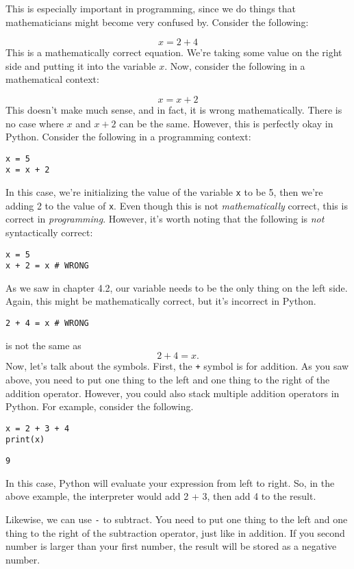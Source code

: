 This is especially important in programming, since we do things that mathematicians might become very confused by. Consider the following:\par
$$
x = 2 + 4
$$
This is a mathematically correct equation. We're taking some value on the right side and putting it into the variable $x$. Now, consider the following in a mathematical context:\par
$$
x = x + 2
$$
This doesn't make much sense, and in fact, it is wrong mathematically. There is no case where $x$ and $x + 2$ can be the same. However, this is perfectly okay in Python. Consider the following in a programming context:\par
\begin{lstlisting}[style=pippython]
x = 5
x = x + 2
\end{lstlisting}
In this case, we're initializing the value of the variable \verb|x| to be 5, then we're adding 2 to the value of \verb|x|. Even though this is not \textit{mathematically} correct, this is correct in \textit{programming}. However, it's worth noting that the following is \textit{not} syntactically correct:\par
\begin{lstlisting}[style=pippython]
x = 5 
x + 2 = x # WRONG
\end{lstlisting}
As we saw in chapter 4.2, our variable needs to be the only thing on the left side. Again, this might be mathematically correct, but it's incorrect in Python.\par
\begin{lstlisting}[style=pippython]
2 + 4 = x # WRONG
\end{lstlisting}
is not the same as 
$$
2 + 4 = x.
$$
Now, let's talk about the  symbols. First, the \verb|+| symbol is for addition. As you saw above, you need to put one thing to the left and one thing to the right of the addition operator. However, you could also stack multiple addition operators in Python. For example, consider the following.\par
\begin{lstlisting}[style=pippython]
x = 2 + 3 + 4
print(x)
\end{lstlisting}
\begin{lstlisting}[style=none]
9
\end{lstlisting}
In this case, Python will evaluate your expression from left to right. So, in the above example, the interpreter would add 2 + 3, then add 4 to the result.\par
Likewise, we can use \verb|-| to subtract. You need to put one thing to the left and one thing to the right of the subtraction operator, just like in addition. If you second number is larger than your first number, the result will be stored as a negative number.\par
